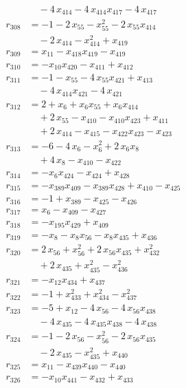 \begin{align*}
&\quad{}- 4\,x_{414} - 4\,x_{414} x_{417} - 4\,x_{417} \\
r_{308} &= -1 - 2\,x_{55} - x_{55}^{2} - 2\,x_{55} x_{414} \\
&\quad{}- 2\,x_{414} - x_{414}^{2} + x_{419} \\
r_{309} &= x_{11} - x_{418} x_{419} - x_{419} \\
r_{310} &= -x_{10} x_{420} - x_{411} + x_{412} \\
r_{311} &= -1 - x_{55} - 4\,x_{55} x_{421} + x_{413} \\
&\quad{}- 4\,x_{414} x_{421} - 4\,x_{421} \\
r_{312} &= 2 + x_{6} + x_{6} x_{55} + x_{6} x_{414} \\
&\quad{}+ 2\,x_{55} - x_{410} - x_{410} x_{423} + x_{411} \\
&\quad{}+ 2\,x_{414} - x_{415} - x_{422} x_{423} - x_{423} \\
r_{313} &= -6 - 4\,x_{6} - x_{6}^{2} + 2\,x_{6} x_{8} \\
&\quad{}+ 4\,x_{8} - x_{410} - x_{422} \\
r_{314} &= -x_{6} x_{424} - x_{424} + x_{428} \\
r_{315} &= -x_{389} x_{409} - x_{389} x_{428} + x_{410} - x_{425} \\
r_{316} &= -1 + x_{389} - x_{425} - x_{426} \\
r_{317} &= x_{6} - x_{409} - x_{427} \\
r_{318} &= -x_{195} x_{429} + x_{409} \\
r_{319} &= -x_{8} - x_{8} x_{56} - x_{8} x_{435} + x_{436} \\
r_{320} &= 2\,x_{56} + x_{56}^{2} + 2\,x_{56} x_{435} + x_{432}^{2} \\
&\quad{}+ 2\,x_{435} + x_{435}^{2} - x_{436}^{2} \\
r_{321} &= -x_{12} x_{434} + x_{437} \\
r_{322} &= -1 + x_{433}^{2} + x_{434}^{2} - x_{437}^{2} \\
r_{323} &= -5 + x_{12} - 4\,x_{56} - 4\,x_{56} x_{438} \\
&\quad{}- 4\,x_{435} - 4\,x_{435} x_{438} - 4\,x_{438} \\
r_{324} &= -1 - 2\,x_{56} - x_{56}^{2} - 2\,x_{56} x_{435} \\
&\quad{}- 2\,x_{435} - x_{435}^{2} + x_{440} \\
r_{325} &= x_{11} - x_{439} x_{440} - x_{440} \\
r_{326} &= -x_{10} x_{441} - x_{432} + x_{433} \\

\end{align*}
